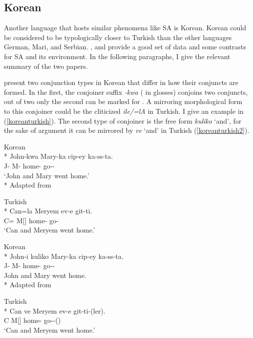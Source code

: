 \subsection{Korean}

Another language that hosts similar phenomena like SA is Korean. Korean could be considered to be typologically closer to Turkish than the other languages German, Mari, and Serbian. \citet{yoon2005conjunction}, and \citet{yoon2017lexical} provide a good set of data and some contrasts for SA and its environment. In the following paragraphs, I give the relevant summary of the two papers.

\citet{yoon2005conjunction} present two conjunction types in Korean that differ in how their conjuncts are formed. In the first, the conjoiner suffix \textit{-kwa} ({\And} in glosses) conjoins two conjuncts, out of two only the second can be marked for {\Case}. A mirroring morphological form to this conjoiner could be the cliticized \textit{ile/=lA} in Turkish. I give an example in (\ref{koreanturkish}). The second type of conjoiner is the free form \textit{kuliko} `and', for the sake of argument it can be mirrored by \textit{ve} `and' in Turkish (\ref{koreanturkish2}).

\begin{exe}
    \ex \label{koreanturkish}
    \begin{xlist}
        \ex Korean \\* 
        \gll John-kwa Mary-ka cip-ey ka-ss-ta. \\ 
        J-{\And} M-{\Nom} home-{\Loc} go-{\Pst}-{\Decl} \\
        \glt `John and Mary went home.'\\*   
        \hfill Adapted from \citet{yoon2005conjunction}

        \ex Turkish\\*
        \gll Can=la Meryem ev-e git-ti. \\ 
        C={\And} M[{\Nom}] home-{\Dat} go-{\Pst} \\
        \glt `Can and Meryem went home.'
    \end{xlist}

    \ex \label{koreanturkish2}
    \begin{xlist}
        \ex Korean \\*
        \gll John-i kuliko Mary-ka cip-ey ka-ss-ta. \\ 
        J-{\Nom} {\And} M-{\Nom} home-{\Loc} go-{\Pst}-{\Decl} \\
        \glt John and Mary went home.\\* 
        \hfill Adapted from \citet{yoon2005conjunction}
        
        \ex Turkish \\*
        \gll Can ve Meryem ev-e git-ti-(ler). \\ 
        C {\And} M[{\Nom}] home-{\Dat} go-{\Pst}-({\Tpl}) \\
        \glt `Can and Meryem went home.'
    \end{xlist}
\end{exe}

